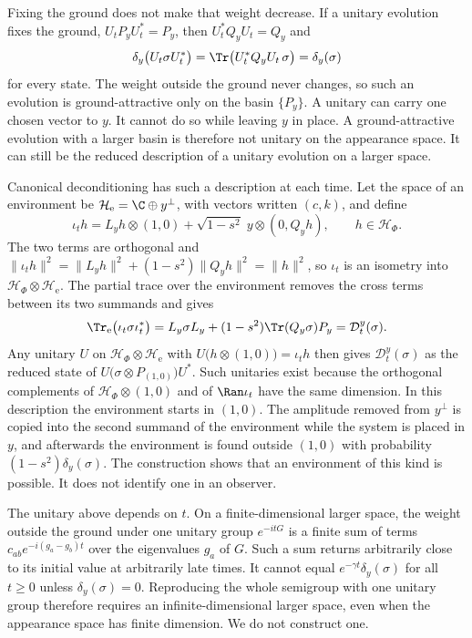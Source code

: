 Fixing the ground does not make that weight decrease. If a unitary evolution fixes the ground, $U_tP_yU_t^*=P_y$, then $U_t^*Q_yU_t=Q_y$ and
\begin{equation}
 \delta_y\bigl(U_t\sigma U_t^*\bigr)=\Tr\bigl(U_t^*Q_yU_t\,\sigma\bigr)=\delta_y(\sigma)
 \label{eq:relaxation-unitary}
\end{equation}
for every state. The weight outside the ground never changes, so such an evolution is ground-attractive only on the basin $\{P_y\}$. A unitary can carry one chosen vector to $y$. It cannot do so while leaving $y$ in place. A ground-attractive evolution with a larger basin is therefore not unitary on the appearance space. It can still be the reduced description of a unitary evolution on a larger space.

Canonical deconditioning has such a description at each time. Let the space of an environment be $\mathcal H_{\mathrm e}=\C\oplus y^\perp$, with vectors written $(c,k)$, and define
\begin{equation}
 \iota_th=L_yh\otimes(1,0)+\sqrt{1-s^2}\;y\otimes(0,Q_yh),\qquad h\in\mathcal H_\Phi .
 \label{eq:relaxation-dilation}
\end{equation}
The two terms are orthogonal and $\|\iota_th\|^2=\|L_yh\|^2+(1-s^2)\|Q_yh\|^2=\|h\|^2$, so $\iota_t$ is an isometry into $\mathcal H_\Phi\otimes\mathcal H_{\mathrm e}$. The partial trace over the environment removes the cross terms between its two summands and gives
\begin{equation}
 \Tr_{\mathrm e}\bigl(\iota_t\sigma\iota_t^*\bigr)=L_y\sigma L_y+(1-s^2)\Tr(Q_y\sigma)P_y=\mathcal D_t^y(\sigma).
 \label{eq:relaxation-dilation-trace}
\end{equation}
Any unitary $U$ on $\mathcal H_\Phi\otimes\mathcal H_{\mathrm e}$ with $U\bigl(h\otimes(1,0)\bigr)=\iota_th$ then gives $\mathcal D_t^y(\sigma)$ as the reduced state of $U\bigl(\sigma\otimes P_{(1,0)}\bigr)U^*$. Such unitaries exist because the orthogonal complements of $\mathcal H_\Phi\otimes(1,0)$ and of $\Ran\iota_t$ have the same dimension. In this description the environment starts in $(1,0)$. The amplitude removed from $y^\perp$ is copied into the second summand of the environment while the system is placed in $y$, and afterwards the environment is found outside $(1,0)$ with probability $(1-s^2)\delta_y(\sigma)$. The construction shows that an environment of this kind is possible. It does not identify one in an observer.

The unitary above depends on $t$. On a finite-dimensional larger space, the weight outside the ground under one unitary group $e^{-itG}$ is a finite sum of terms $c_{ab}e^{-i(g_a-g_b)t}$ over the eigenvalues $g_a$ of $G$. Such a sum returns arbitrarily close to its initial value at arbitrarily late times. It cannot equal $e^{-\gamma t}\delta_y(\sigma)$ for all $t\ge0$ unless $\delta_y(\sigma)=0$. Reproducing the whole semigroup with one unitary group therefore requires an infinite-dimensional larger space, even when the appearance space has finite dimension. We do not construct one.

